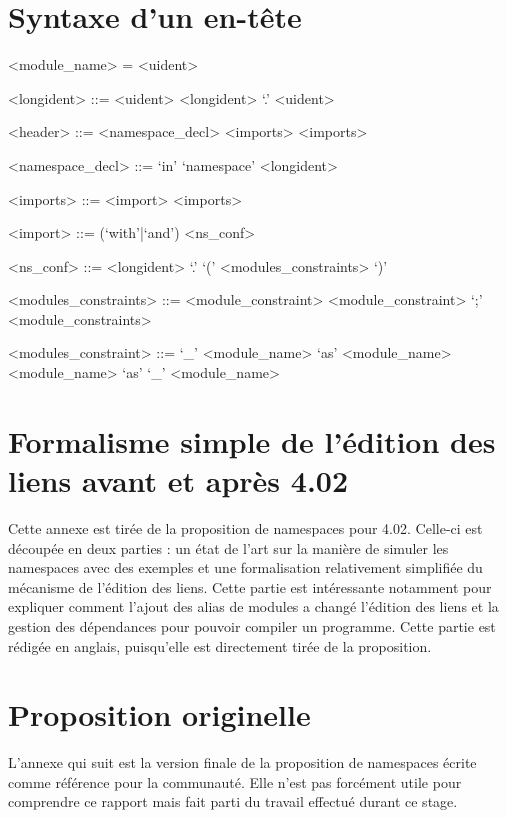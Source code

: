 \documentclass[11pt,a4paper]{report}
\begin{document}
\appendix

\chapter{Syntaxe d'un en-tête}
\label{header-bnf}

\begin{grammar}
<module_name> = <uident>

<longident> ::= <uident>
\alt <longident> `.' <uident>

<header> ::= <namespace_decl> <imports>
\alt <imports>

<namespace_decl> ::= `in' `namespace' <longident>

<imports> ::= <import> <imports> 

<import> ::= (`with'|`and') <ns_conf> 

<ns_conf> ::= <longident> `.' `(' <modules_constraints> `)'

<modules_constraints> ::= <module_constraint>
\alt <module_constraint> `;' <module_constraints>

<modules_constraint> ::= `_'
\alt <module_name> `as' <module_name>
\alt <module_name> `as' `_'
\alt <module_name>
\end{grammar}

\chapter{Formalisme simple de l'édition des liens avant et après 4.02}
\label{appendix-soa}

Cette annexe est tirée de la proposition de namespaces pour 4.02. Celle-ci est
découpée en deux parties : un état de l'art sur la manière de simuler les
namespaces avec des exemples et une formalisation relativement simplifiée du
mécanisme de l'édition des liens. Cette partie est intéressante notamment pour
expliquer comment l'ajout des alias de modules a changé l'édition des liens et
la gestion des dépendances pour pouvoir compiler un programme. Cette partie est
rédigée en anglais, puisqu'elle est directement tirée de la proposition.




\chapter{Proposition originelle}

L'annexe qui suit est la version finale de la proposition de namespaces écrite
comme référence pour la communauté. Elle n'est pas forcément utile pour
comprendre ce rapport mais fait parti du travail effectué durant ce stage.


\end{document}
